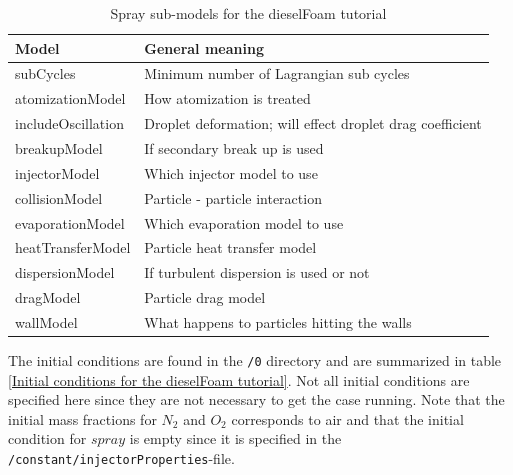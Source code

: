 \documentclass{report}
\begin{document}
\begin{table}[h]
\begin{center}
\begin{tabular}{l|l}
	Model & General meaning  \\ \hline
	subCycles & Minimum number of Lagrangian sub cycles\\
	atomizationModel & How atomization is treated \\
	includeOscillation & Droplet deformation; will effect droplet drag coefficient\\
	breakupModel & If secondary break up is used \\
	injectorModel & Which injector model to use \\
	collisionModel & Particle - particle interaction \\
	evaporationModel & Which evaporation model to use \\
	heatTransferModel & Particle heat transfer model \\
	dispersionModel & If turbulent dispersion is used or not \\
	dragModel &  Particle drag model\\
	wallModel & What happens to particles hitting the walls
\end{tabular}
\caption{Spray sub-models for the dieselFoam tutorial}
\label{Model settings in /constant/sprayProperties-file for the dieselFoam tutorial}
\end{center}
\end{table}
\newline
\noindent
The initial conditions are found in the \verb+/0+ directory and are summarized in table \ref{Initial conditions for the dieselFoam tutorial}. Not all initial conditions are specified here since they are not necessary to get the case running. Note that the initial mass fractions for $N_2$ and $O_2$ corresponds to air and that the initial condition for $spray$ is empty since it is specified in the \verb+/constant/injectorProperties+-file.    
\end{document}
